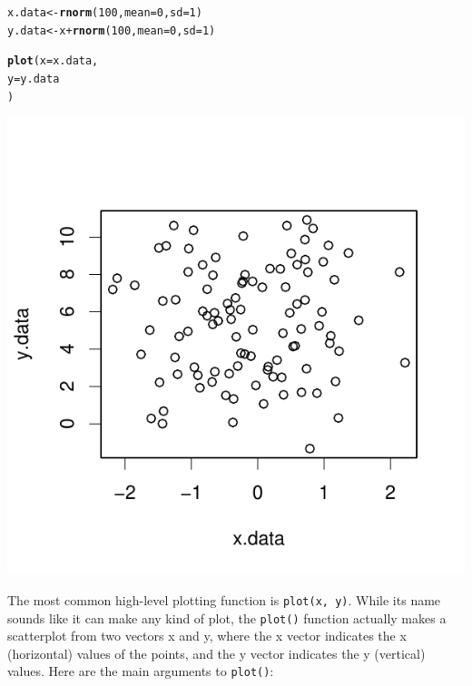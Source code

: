 \documentclass{tufte-book}\usepackage[]{graphicx}\usepackage[]{color}
\makeatletter
\def\maxwidth{ %
  \ifdim\Gin@nat@width>\linewidth
    \linewidth
  \else
    \Gin@nat@width
  \fi
}
\newcommand{\hlnum}[1]{\textcolor[rgb]{0.686,0.059,0.569}{#1}}%
\newcommand{\hlopt}[1]{\textcolor[rgb]{0,0,0}{#1}}%
\newcommand{\hlstd}[1]{\textcolor[rgb]{0.345,0.345,0.345}{#1}}%
\newcommand{\hlkwb}[1]{\textcolor[rgb]{0.69,0.353,0.396}{#1}}%
\newcommand{\hlkwc}[1]{\textcolor[rgb]{0.333,0.667,0.333}{#1}}%
\newcommand{\hlkwd}[1]{\textcolor[rgb]{0.737,0.353,0.396}{\textbf{#1}}}%
\newenvironment{kframe}{%
 \def\at@end@of@kframe{}%
 \ifinner\ifhmode%
  \def\at@end@of@kframe{\end{minipage}}%
  \begin{minipage}{\columnwidth}%
 \fi\fi%
 \def\FrameCommand##1{\hskip\@totalleftmargin \hskip-\fboxsep
 \colorbox{shadecolor}{##1}\hskip-\fboxsep
     \hskip-\linewidth \hskip-\@totalleftmargin \hskip\columnwidth}%
 \MakeFramed {\advance\hsize-\width
   \@totalleftmargin\z@ \linewidth\hsize
   \@setminipage}}%
 {\par\unskip\endMakeFramed%
 \at@end@of@kframe}
\newenvironment{knitrout}{}{} %
\makeatother
\begin{document}
\begin{marginfigure}
\begin{knitrout}
\color{fgcolor}\begin{kframe}
\begin{alltt}
\hlstd{x.data} \hlkwb{<-} \hlkwd{rnorm}\hlstd{(}\hlnum{100}\hlstd{,} \hlkwc{mean} \hlstd{=} \hlnum{0}\hlstd{,} \hlkwc{sd} \hlstd{=} \hlnum{1}\hlstd{)}
\hlstd{y.data} \hlkwb{<-} \hlstd{x} \hlopt{+} \hlkwd{rnorm}\hlstd{(}\hlnum{100}\hlstd{,} \hlkwc{mean} \hlstd{=} \hlnum{0}\hlstd{,} \hlkwc{sd} \hlstd{=} \hlnum{1}\hlstd{)}

\hlkwd{plot}\hlstd{(}\hlkwc{x} \hlstd{= x.data,}
     \hlkwc{y} \hlstd{= y.data}
     \hlstd{)}
\end{alltt}
\end{kframe}
\includegraphics[width=\maxwidth]{figure/unnamed-chunk-192-1} 

\end{knitrout}

\end{marginfigure}

The most common high-level plotting function is \texttt{plot(x, y)}. While its name sounds like it can make any kind of plot, the \texttt{plot()} function actually makes a scatterplot from two vectors x and y, where the x vector indicates the x (horizontal) values of the points, and the y vector indicates the y (vertical) values. Here are the main arguments to \texttt{plot()}:
\end{document}

